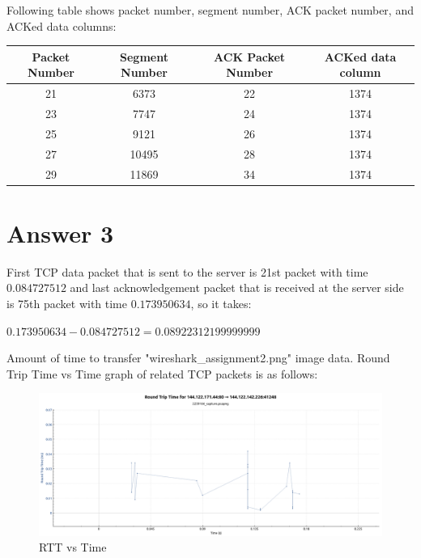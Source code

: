 \documentclass[10pt]{article}
\begin{document}
Following table shows packet number, segment number, ACK packet number, and ACKed data columns: \\

\begin{table}[H]
\small
\centering
\begin{tabular}{|c|c|c|c|}	
\hline
Packet Number & Segment Number & ACK Packet Number & ACKed data column \\
\hline 
21 & 6373 & 22 & 1374 \\			
23 & 7747 & 24 & 1374 \\
25 & 9121 & 26 & 1374 \\
27 & 10495 & 28 & 1374 \\
29 & 11869 & 34 & 1374 \\
\hline 
\end{tabular}
\end{table}

\section*{Answer 3}
\hspace{4mm}	
First TCP data packet that is sent to the server is 21st packet with time $0.084727512$ and last acknowledgement packet that is received at the server side is 75th packet with time $0.173950634$, so it takes: 
\begin{center}
$0.173950634 - 0.084727512 = 0.08922312199999999$
\end{center}

Amount of time to transfer "wireshark\_assignment2.png" image data. Round Trip Time vs Time graph of related TCP packets is as follows:

\begin{figure}[H]
    \centering
    \includegraphics[scale=0.32]{graph.png}
    \caption{RTT vs Time}
\end{figure}
\end{document}
